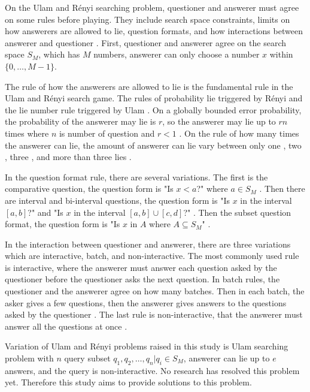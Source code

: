 \documentclass{TTP_DSL2006}
\begin{document}
On the Ulam and Rényi searching problem, questioner and answerer must agree on some rules before playing. They include search space constraints, limits on how answerers are allowed to lie, question formats, and how interactions between answerer and questioner \cite{Pelc2002}. First, questioner and answerer agree on the search space $S_M$, which has $M$ numbers, answerer can only choose a number $x$ within $\{0,\ldots,M-1\}$.

The rule of how the answerers are allowed to lie is the fundamental rule in the Ulam and Rényi search game. The rules of probability lie triggered by Rényi and the lie number rule triggered by Ulam \cite{Ulam1991}. On a globally bounded error probability, the probability of the answerer may lie is $r$, so the answerer may lie up to $rn$ times where $n$ is number of question and $r<1$ \cite{Dhagat1992}. On the rule of how many times the answerer can lie, the amount of answerer can lie vary between only one \cite{Ellis2008} \cite{Pelc1988}, two \cite{Cicalese2000}, three \cite{Negro1992}, and more than three lies \cite{Berlekamp1998} \cite{Deppe2004}.

In the question format rule, there are several variations. The first is the comparative question, the question form is "Is $x<a$?" where $a \in S_M$ \cite{Innes} \cite{Auletta1992}. Then there are interval and bi-interval questions, the question form is "Is $x$ in the interval $[a, b]$?" \cite{Peter2017} and "Is $x$ in the interval $[a, b] \cup [c, d]$?" \cite{Mundici1997}. Then the subset question format, the question form is "Is $x$ in $A$ where $A \subseteq S_M$" \cite{Katona} \cite{Macula1997}.

In the interaction between questioner and answerer, there are three variations which are interactive, batch, and non-interactive. The most commonly used rule is interactive, where the answerer must answer each question asked by the questioner before the questioner asks the next question. In batch rules, the questioner and the answerer agree on how many batches. Then in each batch, the asker gives a few questions, then the answerer gives answers to the questions asked by the questioner \cite{Cicalese2000}. The last rule is non-interactive, that the answerer must answer all the questions at once \cite{Macula1997}.

Variation of Ulam and Rényi problems raised in this study is Ulam searching problem with $n$ query subset ${q_1,q_2,\ldots,q_n} | q_i \in S_M$, answerer can lie up to $e$ answers, and the query is non-interactive. No research has resolved this problem yet. Therefore this study aims to provide solutions to this problem.
\end{document}

